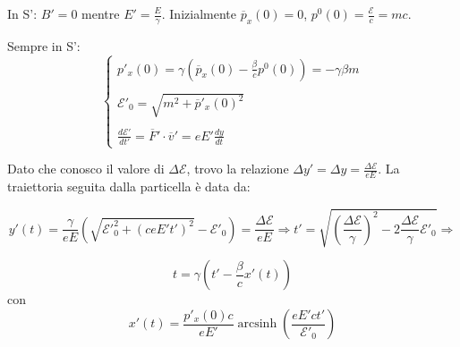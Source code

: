 \documentclass[12pt,twoside,a4]{article}
\DeclareMathOperator{\arcsinh}{arcsinh}
\begin{document}
\begin{solution}In S': $B' = 0$ mentre $E' = \frac{E}{\gamma}$. Inizialmente $\overline{p}_x(0) = 0$, $p^0(0) = \frac{\mathcal{E}}{c} = mc$.

\noindent Sempre in S':
\begin{equation*}
\begin{cases}
    p'_x(0) = \gamma \left(\overline{p}_x(0) - \frac{\beta}{c}p^0(0)\right) = -\gamma \beta m \\
    \\
\mathcal{E}'_0 = \sqrt{m^2 + \overline{p}'_x(0)^2} \\
\\
\frac{d\mathcal{E}'}{dt'} = \overline{F}' \cdot \overline{v}' = eE'\frac{dy}{dt}\end{cases} 
\end{equation*} 

Dato che conosco il valore di $\Delta \mathcal{E}$, trovo la relazione $\Delta y' = \Delta y = \frac{\Delta \mathcal{E}}{eE}$. La traiettoria seguita dalla particella è data da:

\begin{equation*} %
y'(t) = \frac{\gamma}{eE} \left(\sqrt{\mathcal{E}'^2_0 + (ceE't')^2} - \mathcal{E}'_0 \right) = \frac{\Delta \mathcal{E}}{eE} \Rightarrow  t' = \sqrt{\left(\frac{\Delta \mathcal{E}}{\gamma} \right)^2 - 2 \frac{\Delta \mathcal{E}}{\gamma} \mathcal{E}'_0} \Rightarrow
\end{equation*}

\begin{equation*}
\boxed{ t = \gamma \left(t' - \frac{\beta}{c}x'(t) \right) }
\end{equation*} 
con
\begin{equation*}
x'(t) = \frac{p'_x(0) c}{eE'} \arcsinh \left(\frac{eE'ct'}{\mathcal{E}'_0} \right) 
\end{equation*}\end{solution}
\end{document}
